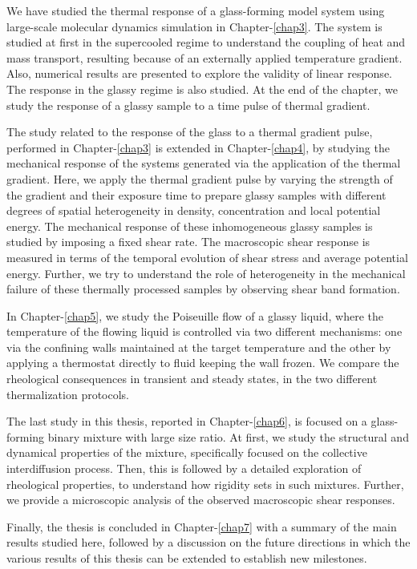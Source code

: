 We have studied the thermal response of a glass-forming model system using large-scale molecular dynamics simulation in Chapter-\ref{chap3}. The system is studied at first in the supercooled regime to understand the coupling of heat and mass transport, resulting because of an externally applied temperature gradient. Also, numerical results are presented to explore the validity of linear response. The response in the glassy regime is also studied. At the end of the chapter, we study the response of a glassy sample to a time pulse of thermal gradient.

The study related to the response of the glass to a thermal gradient pulse, performed in Chapter-\ref{chap3} is extended in Chapter-\ref{chap4}, by studying the mechanical response of the systems generated via the application of the thermal gradient. Here, we apply the thermal gradient pulse by varying the strength of the gradient and their exposure time to prepare glassy samples with different degrees of spatial heterogeneity in density, concentration and local potential energy. The mechanical response of these inhomogeneous glassy samples is studied by imposing a fixed shear rate. The macroscopic shear response is measured in terms of the temporal evolution of shear stress and average potential energy. Further, we try to understand the role of heterogeneity in the mechanical failure of these thermally processed samples by observing shear band formation.

In Chapter-\ref{chap5}, we study the Poiseuille flow of a glassy liquid, where the temperature of the flowing liquid is controlled via two different mechanisms: one via the confining walls maintained at the target temperature and the other by applying a thermostat directly to fluid keeping the wall frozen. We compare the rheological consequences in transient and steady states, in the two different thermalization protocols.

The last study in this thesis, reported in Chapter-\ref{chap6}, is focused on a glass-forming binary mixture with large size ratio. At first, we study the structural and dynamical properties of the mixture, specifically focused on the collective interdiffusion process. Then, this is followed by a detailed exploration of rheological properties, to understand how rigidity sets in such mixtures. Further, we provide a microscopic analysis of the observed macroscopic shear responses.

Finally, the thesis is concluded in Chapter-\ref{chap7} with a summary of the main results studied here, followed by a discussion on the future directions in which the various results of this thesis can be extended to establish new milestones.

